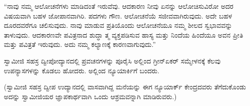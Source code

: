 “ನಾವು ನಮ್ಮ ಆಲೋಚನೆಗಳು ಮಾಡಿದಂತೆ ಇರುವೆವು. ಆದಕಾರಣ ನೀವು ಏನನ್ನು ಆಲೋಚಿಸುವಿರೋ ಅದರ ವಿಷಯವಾಗಿ ಬಹಳ ಜೋಪಾನವಾಗಿರಿ. ಪದಗಳು ಗೌಣ. ಆಲೋಚನೆಯೆ ಸಜೀವವಾಗಿರುವುದು. ಅದೇ ಬಹಳ ದೂರದವರೆಗೂ ಚಲಿಸುವುದು. ನಾವು ಮಾಡುವ ಪ್ರತಿಯೊಂದು ಆಲೋಚನೆಯೂ ನಮ್ಮ ಶೀಲದ ಸ್ವಭಾವವನ್ನು ತಾಳುವುದು. ಆದಕಾರಣವೇ ಪವಿತ್ರನಾದ ಶುದ್ಧಾ ತ್ಮ ವ್ಯಕ್ತಪಡಿಸುವ ಹಾಸ್ಯ ಮತ್ತು ನಿಂದೆಯ ಹಿಂದೆಯೂ ಅವನ ಪ್ರೀತಿ ಮತ್ತು ಪವಿತ್ರತೆ ಇರುವುದು. ಅದು ನಮ್ಮ ಕಲ್ಯಾಣಕ್ಕೆ ಕಾರಣವಾಗುವುದು.” 

\delimiter

 ಸ್ವಾಮೀಜಿ ಸಹಸ್ರ ದ್ವೀಪೋದ್ಯಾನದಲ್ಲಿ ಪ್ರವಚನಗಳನ್ನು ಪೂರೈಸಿ ಅಲ್ಲಿಂದ ಗ್ರೀನ್‍ಏಕರ್ ಸಮ್ಮೇಳನಕ್ಕೆ ಕೆಲವು ಉಪನ್ಯಾಸಗಳನ್ನು ಕೊಡಲು ಹೋದರು. ಅಲ್ಲಿಂದ ನ್ಯೂಯಾರ್ಕಿಗೆ ಬಂದರು. 

 (ಸ್ವಾಮೀಜಿ ಸಹಸ್ರ ದ್ವೀಪ ಉದ್ಯಾನದಲ್ಲಿ ವಾಸವಾಗಿದ್ದ ಮನೆಯನ್ನು ಈಗ ನ್ಯೂಯಾರ್ಕ್ ಕೇಂದ್ರದವರು ತೆಗೆದುಕೊಂಡು ಅದನ್ನು ಸ್ವಾಮೀಜಿಯರ ಜ್ಞಾಪಕಾರ್ಥವಾಗಿ ಒಂದು ಆಶ್ರಮವನ್ನಾಗಿ ಮಾಡಿರುವರು.) 

